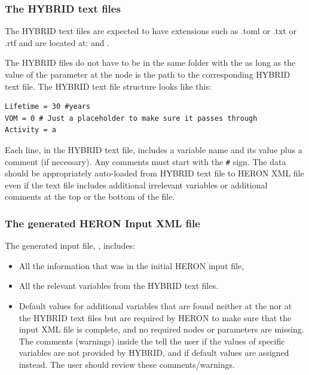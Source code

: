 \subsubsection{The HYBRID text files}
The HYBRID text files are expected to have extensions such as .toml or .txt or .rtf and are located at:
 and
.

The HYBRID files do not have to be in the same folder with the  as long as the value of the  parameter at the  node is the path to the corresponding HYBRID text file. The HYBRID text file structure looks like this:
\begin{lstlisting}
Lifetime = 30 #years
VOM = 0 # Just a placeholder to make sure it passes through
Activity = a
\end{lstlisting}

Each line, in the HYBRID text file, includes a variable name and its value plus a comment (if necessary). Any comments must start with the \verb|#| sign. The data should be appropriately auto-loaded from HYBRID text file to HERON XML file even if the text file includes additional irrelevant variables or additional comments at the top or the bottom of the file.

\subsubsection{The generated HERON Input XML file}
The generated input file, , includes:
\begin{itemize}
\item All the information that was in the initial HERON input file,       
\item All the relevant variables from the HYBRID text files.
\item Default values for additional variables that are found neither at the  nor at the HYBRID text files but are required by HERON to make sure that the input XML file is complete, and no required nodes or parameters are missing. The comments (warnings) inside the  tell the user if the values of specific variables are not provided by HYBRID, and if default values are assigned instead. The user should review these comments/warnings.
\end{itemize}

